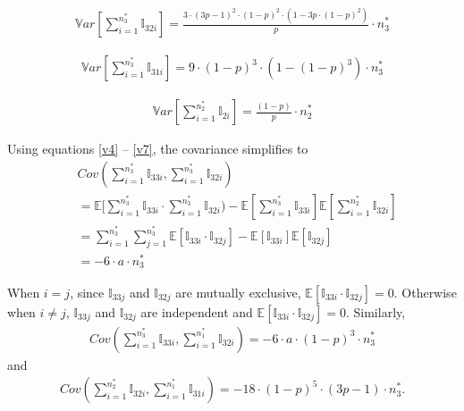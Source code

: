 \documentclass[aoas]{imsart}
\begin{document}
\begin{equation}
\label{v5}
\begin{split}
\mathbb{V}ar[\sum_{i=1}^{n_3^*}{\mathbb{I}_{32i}}]
= \frac{3 \cdot (3p-1)^2 \cdot (1-p)^2 \cdot (1-3p \cdot (1-p)^2)}{p} \cdot n_3^*
\end{split}
\end{equation}

\begin{equation}
\label{v6}
\begin{split}
\mathbb{V}ar[\sum_{i=1}^{n_3^*}{\mathbb{I}_{31i}}]
= 9 \cdot (1-p)^3 \cdot (1-(1-p)^3) \cdot n_3^*
\end{split}
\end{equation}

\begin{equation}
\label{v7}
\begin{split}
\mathbb{V}ar[\sum_{i=1}^{n_2^*}{\mathbb{I}_{2i}}]
= \frac{(1-p)}{p} \cdot n_2^*
\end{split}
\end{equation}

Using equations \ref{v4} -- \ref{v7}, the covariance simplifies to
\begin{equation*}
\begin{split}
&Cov(\sum_{i=1}^{n_3^*}{\mathbb{I}_{33i}}, \sum_{i=1}^{n_3^*}{\mathbb{I}_{32i}})\\
&=  \mathbb{E}[\sum_{i=1}^{n_3^*}{\mathbb{I}_{33i}} \cdot \sum_{i=1}^{n_3^*}{\mathbb{I}_{32i}}) -  	\mathbb{E}[\sum_{i=1}^{n_3^*}{\mathbb{I}_{33i}}] \mathbb{E}[\sum_{i=1}^{n_2^*}{\mathbb{I}_{32i}}]\\
&=  \sum_{i=1}^{n_3^*}{\sum_{j=1}^{n_3^*}{
		\mathbb{E}[\mathbb{I}_{33i} \cdot \mathbb{I}_{32j}] -  	
		\mathbb{E}[\mathbb{I}_{33i}]
		\mathbb{E}[\mathbb{I}_{32j}]}}\\
&=-6 \cdot a \cdot n_3^*
\end{split}
\end{equation*}

When $i=j$, since $\mathbb{I}_{33j}$ and $\mathbb{I}_{32j}$ are mutually exclusive, $\mathbb{E}[\mathbb{I}_{33i} \cdot \mathbb{I}_{32j}]=0$. Otherwise when $i \neq j$, $\mathbb{I}_{33j}$ and $\mathbb{I}_{32j}$ are independent and $\mathbb{E}[\mathbb{I}_{33i} \cdot \mathbb{I}_{32j}]=0$. Similarly,
\begin{equation*}
\begin{split}
Cov(\sum_{i=1}^{n_3^*}{\mathbb{I}_{33i}}, \sum_{i=1}^{n_1^*}{\mathbb{I}_{32i}})
= - 6 \cdot a \cdot (1-p)^3 \cdot n_3^*
\end{split}
\end{equation*}
and
\begin{equation*}
\begin{split}
Cov(\sum_{i=1}^{n_2^*}{\mathbb{I}_{32i}}, \sum_{i=1}^{n_1^*}{\mathbb{I}_{31i}})
= - 18 \cdot (1-p)^5 \cdot (3p-1) \cdot n_3^*.
\end{split}
\end{equation*}
\end{document}
